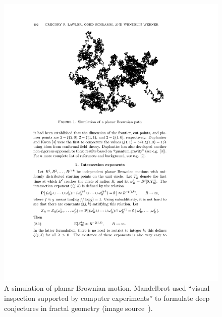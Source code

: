 \documentclass{llncs}
\begin{document}
\begin{figure}[h!]
  \centering
\includegraphics[scale=0.5]{brownian_motion.pdf}
  \caption{A simulation of planar Brownian motion. Mandelbrot used ``visual
inspection supported by computer experiments'' to formulate deep
conjectures in fractal geometry (image source~\cite{LSW01}).}
\label{fig:4/3}
\end{figure}

%
%

\end{document}
